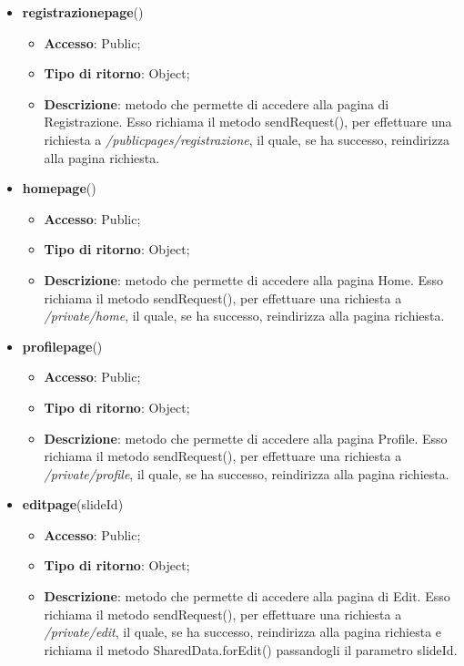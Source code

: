 {{{\begin{itemize}
				\item \textbf{registrazionepage}()
				\begin{itemize}
					\item \textbf{Accesso}: Public;
					\item \textbf{Tipo di ritorno}: Object;
					\item \textbf{Descrizione}: metodo che permette di accedere alla pagina di Registrazione. Esso richiama il metodo sendRequest(), per effettuare una richiesta a \textit{/publicpages/registrazione}, il quale, se ha successo, reindirizza alla pagina richiesta.
				\end{itemize}
				\item \textbf{homepage}()
				\begin{itemize}
					\item \textbf{Accesso}: Public;
					\item \textbf{Tipo di ritorno}: Object;
					\item \textbf{Descrizione}: metodo che permette di accedere alla pagina Home. Esso richiama il metodo sendRequest(), per effettuare una richiesta a \textit{/private/home}, il quale, se ha successo, reindirizza alla pagina richiesta.
				\end{itemize}
				\item \textbf{profilepage}()
				\begin{itemize}
					\item \textbf{Accesso}: Public;
					\item \textbf{Tipo di ritorno}: Object;
					\item \textbf{Descrizione}: metodo che permette di accedere alla pagina Profile. Esso richiama il metodo sendRequest(), per effettuare una richiesta a \textit{/private/profile}, il quale, se ha successo, reindirizza alla pagina richiesta.
				\end{itemize}
				\item \textbf{editpage}(slideId)
				\begin{itemize}
					\item \textbf{Accesso}: Public;
					\item \textbf{Tipo di ritorno}: Object;
					\item \textbf{Descrizione}: metodo che permette di accedere alla pagina di Edit. Esso richiama il metodo sendRequest(), per effettuare una richiesta a \textit{/private/edit}, il quale, se ha successo, reindirizza alla pagina richiesta e richiama il metodo SharedData.forEdit() passandogli il parametro slideId.
				\end{itemize}

\end{itemize}}}}

